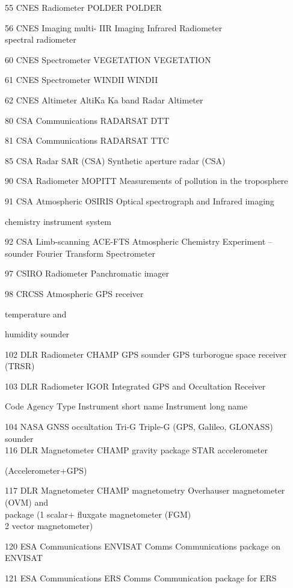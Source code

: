 55 CNES Radiometer POLDER POLDER

56 CNES Imaging multi- IIR Imaging Infrared Radiometer\\
spectral radiometer

60 CNES Spectrometer VEGETATION VEGETATION

61 CNES Spectrometer WINDII WINDII

62 CNES Altimeter AltiKa Ka band Radar Altimeter

80 CSA Communications RADARSAT DTT

81 CSA Communications RADARSAT TTC

85 CSA Radar SAR (CSA) Synthetic aperture radar (CSA)

90 CSA Radiometer MOPITT Measurements of pollution in the troposphere

91 CSA Atmospheric OSIRIS Optical spectrograph and Infrared imaging

chemistry instrument system

92 CSA Limb-scanning ACE-FTS Atmospheric Chemistry Experiment --\\
sounder Fourier Transform Spectrometer

97 CSIRO Radiometer Panchromatic imager

98 CRCSS Atmospheric GPS receiver

temperature and

humidity sounder

102 DLR Radiometer CHAMP GPS sounder GPS turborogue space receiver (TRSR)

103 DLR Radiometer IGOR Integrated GPS and Occultation Receiver

Code Agency Type Instrument short name Instrument long name

104 NASA GNSS occultation Tri-G Triple-G (GPS, Galileo, GLONASS)\\
sounder\\
116 DLR Magnetometer CHAMP gravity package STAR accelerometer

(Accelerometer+GPS)

117 DLR Magnetometer CHAMP magnetometry Overhauser magnetometer (OVM) and\\
package (1 scalar+ fluxgate magnetometer (FGM)\\
2 vector magnetometer)

120 ESA Communications ENVISAT Comms Communications package on ENVISAT

121 ESA Communications ERS Comms Communication package for ERS

